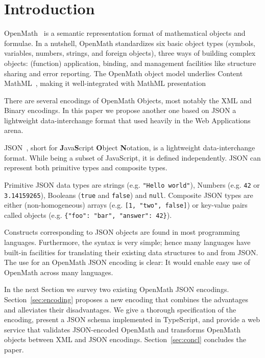 \section{Introduction}

OpenMath~\cite {BusCapCar:oms04} is a semantic representation format of mathematical
objects and formulae. In a nutshell, OpenMath standardizes six basic object types
(symbols, variables, numbers, strings, and foreign objects), three ways of building
complex objects: (function) application, binding, and management facilities like structure
sharing and error reporting. The OpenMath object model underlies Content
MathML~\cite{CarlisleEd:MathML3:on}, making it well-integrated with MathML presentation

There are several encodings of OpenMath Objects, most notably the XML and Binary
encodings. In this paper we propose another one based on JSON a lightweight
data-interchange format that used heavily in the Web Applications arena.

JSON~\cite{JSON:web}, short for \textbf{J}ava\textbf{S}cript \textbf{O}bject
\textbf{N}otation, is a lightweight data-interchange format.  While being a subset of
JavaScript, it is defined independently.  JSON can represent both primitive types and
composite types.

Primitive JSON data types are strings (e.g. \lstinline{"Hello world"}), Numbers
(e.g. \lstinline{42} or \lstinline{3.14159265}), Booleans (\lstinline{true} and
\lstinline{false}) and \lstinline{null}.  Composite JSON types are either
(non-homogeneous) arrays (e.g. \lstinline{[1, "two", false]}) or key-value pairs called
objects (e.g. \lstinline|{"foo": "bar", "answer": 42}|).

Constructs corresponding to JSON objects are found in most programming languages.
Furthermore, the syntax is very simple; hence many languages have built-in facilities for
translating their existing data structures to and from JSON.  The use for an OpenMath JSON
encoding is clear: It would enable easy use of OpenMath across many languages.

In the next Section we survey two existing OpenMath JSON
encodings. Section~\ref{sec:encoding} proposes a new encoding that combines the advantages
and alleviates their disadvantages. We give a thorough specification of the encoding,
present a JSON schema implemented in TypeScript, and provide a web service that validates
JSON-encoded OpenMath and transforms OpenMath objects between XML and JSON
encodings. Section~\ref{sec:concl} concludes the paper.


